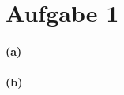 \documentclass[11pt,a4paper]{article}
\begin{document}
\section*{Aufgabe 1}
\paragraph*{(a)}
\paragraph*{(b)}
\end{document}
